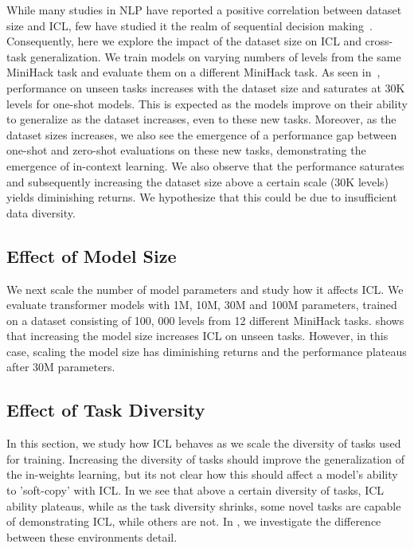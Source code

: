  While many studies in NLP \citep{gpt3, scaling-laws, olsson2022incontext} have reported a positive correlation between dataset size and ICL, few have studied it the realm of sequential decision making~\citep{adaptiveagentteam2023humantimescale}. Consequently, here we explore the impact of the dataset size on ICL and cross-task generalization.  We train models on varying numbers of levels from the same MiniHack task and evaluate them on a different MiniHack task. As seen in~, performance on unseen tasks increases with the dataset size and saturates at 30K levels for one-shot models.  This is expected as the models improve on their ability to generalize as the dataset increases, even to these new tasks. Moreover, as the dataset sizes increases, we also see the emergence of a performance gap between one-shot and zero-shot evaluations on these new tasks, demonstrating the emergence of in-context learning. We also observe  that the performance saturates and subsequently increasing the dataset size above a certain scale (30K levels) yields diminishing returns. We hypothesize that this could be due to insufficient data diversity. 

\subsection{Effect of Model Size} We next scale the number of model parameters and study how it affects ICL. We evaluate transformer models with 1M, 10M, 30M and 100M parameters, trained on a dataset consisting of 100, 000 levels from 12 different MiniHack tasks.  shows that increasing the model size increases ICL on unseen tasks. However, in this case, scaling the model size has diminishing returns and the performance plateaus after 30M parameters. 

\subsection{Effect of Task Diversity} In this section, we study how ICL behaves as we scale the diversity of tasks used for training. Increasing the diversity of tasks should improve the generalization of the in-weights learning, but its not clear how this should affect a model's ability to 'soft-copy' with ICL.  In  we see that above a certain diversity of tasks, ICL ability plateaus, while as the task diversity shrinks, some novel tasks are capable of demonstrating ICL, while others are not.  In , we investigate the difference between these environments detail. 
